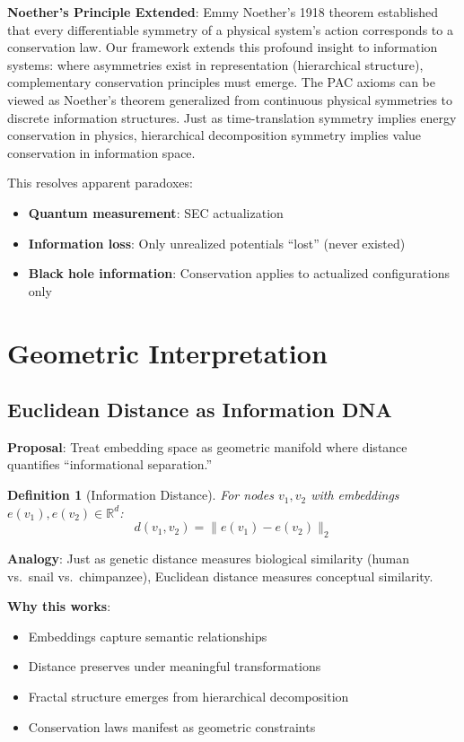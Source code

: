 \documentclass[11pt,a4paper]{article}
\newtheorem{definition}{Definition}
\newcommand{\R}{\mathbb{R}}
\newcommand{\Rtd}{\R^d}
\newcommand{\norm}[1]{\|#1\|}
\begin{document}
\textbf{Noether's Principle Extended}: Emmy Noether's 1918 theorem established that every differentiable symmetry of a physical system's action corresponds to a conservation law. Our framework extends this profound insight to information systems: where asymmetries exist in representation (hierarchical structure), complementary conservation principles must emerge. The PAC axioms can be viewed as Noether's theorem generalized from continuous physical symmetries to discrete information structures. Just as time-translation symmetry implies energy conservation in physics, hierarchical decomposition symmetry implies value conservation in information space.

This resolves apparent paradoxes:
\begin{itemize}
    \item \textbf{Quantum measurement}: SEC actualization
    \item \textbf{Information loss}: Only unrealized potentials ``lost'' (never existed)
    \item \textbf{Black hole information}: Conservation applies to actualized configurations only
\end{itemize}

\section{Geometric Interpretation}

\subsection{Euclidean Distance as Information DNA}

\textbf{Proposal}: Treat embedding space as geometric manifold where distance quantifies ``informational separation.''

\begin{definition}[Information Distance]
For nodes $v_1, v_2$ with embeddings $e(v_1), e(v_2) \in \Rtd$:
\begin{equation}
d(v_1, v_2) = \norm{e(v_1) - e(v_2)}_2
\end{equation}
\end{definition}

\textbf{Analogy}: Just as genetic distance measures biological similarity (human vs.\ snail vs.\ chimpanzee), Euclidean distance measures conceptual similarity.

\textbf{Why this works}:
\begin{itemize}
    \item Embeddings capture semantic relationships
    \item Distance preserves under meaningful transformations
    \item Fractal structure emerges from hierarchical decomposition
    \item Conservation laws manifest as geometric constraints
\end{itemize}
\end{document}
